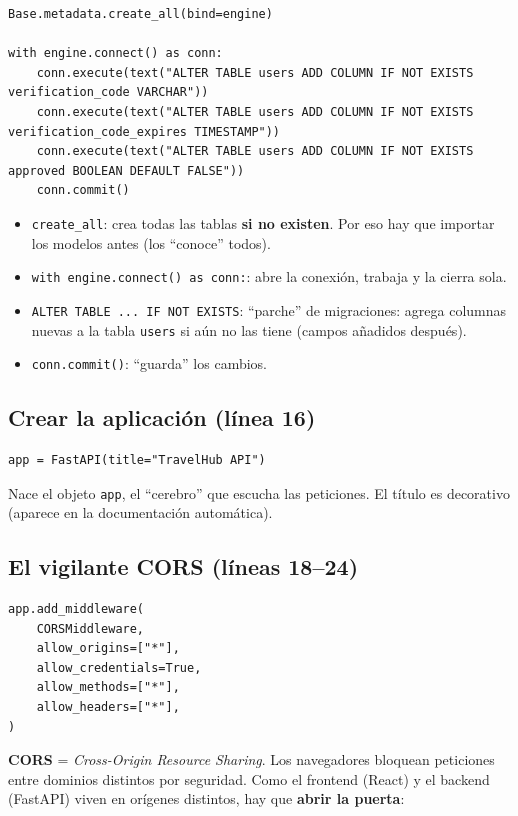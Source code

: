 \documentclass[11pt,a4paper]{article}
\begin{document}
\begin{lstlisting}
Base.metadata.create_all(bind=engine)

with engine.connect() as conn:
    conn.execute(text("ALTER TABLE users ADD COLUMN IF NOT EXISTS verification_code VARCHAR"))
    conn.execute(text("ALTER TABLE users ADD COLUMN IF NOT EXISTS verification_code_expires TIMESTAMP"))
    conn.execute(text("ALTER TABLE users ADD COLUMN IF NOT EXISTS approved BOOLEAN DEFAULT FALSE"))
    conn.commit()
\end{lstlisting}

\begin{itemize}
    \item \texttt{create\_all}: crea todas las tablas \textbf{si no existen}. Por eso hay que
    importar los modelos antes (los ``conoce'' todos).
    \item \texttt{with engine.connect() as conn:}: abre la conexión, trabaja y la cierra sola.
    \item \texttt{ALTER TABLE ... IF NOT EXISTS}: ``parche'' de migraciones: agrega columnas
    nuevas a la tabla \texttt{users} si aún no las tiene (campos añadidos después).
    \item \texttt{conn.commit()}: ``guarda'' los cambios.
\end{itemize}

\subsection{Crear la aplicación (línea 16)}

\begin{lstlisting}
app = FastAPI(title="TravelHub API")
\end{lstlisting}

Nace el objeto \texttt{app}, el ``cerebro'' que escucha las peticiones. El título es decorativo
(aparece en la documentación automática).

\subsection{El vigilante CORS (líneas 18--24)}

\begin{lstlisting}
app.add_middleware(
    CORSMiddleware,
    allow_origins=["*"],
    allow_credentials=True,
    allow_methods=["*"],
    allow_headers=["*"],
)
\end{lstlisting}

\textbf{CORS} = \emph{Cross-Origin Resource Sharing}. Los navegadores bloquean peticiones entre
dominios distintos por seguridad. Como el frontend (React) y el backend (FastAPI) viven en
orígenes distintos, hay que \textbf{abrir la puerta}:
\end{document}
